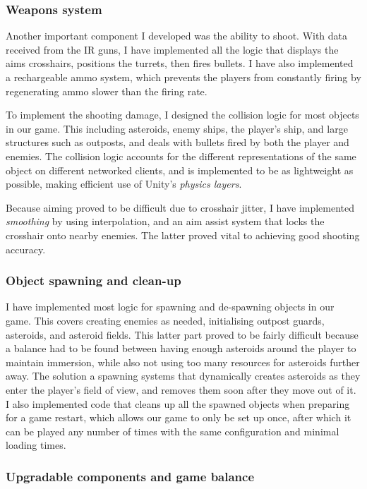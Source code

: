 \documentclass[a4paper,11pt]{article}
\begin{document}
\subsubsection{Weapons system}

Another important component I developed was the ability to shoot. With data received from the IR guns, I have implemented all the logic that displays the aims crosshairs, positions the turrets, then fires bullets. I have also implemented a rechargeable ammo system, which prevents the players from constantly firing by regenerating ammo slower than the firing rate.

To implement the shooting damage, I designed the collision logic for most objects in our game. This including asteroids, enemy ships, the player’s ship, and large structures such as outposts, and deals with bullets fired by both the player and enemies. The collision logic accounts for the different representations of the same object on different networked clients, and is implemented to be as lightweight as possible, making efficient use of Unity's \emph{physics layers}.

Because aiming proved to be difficult due to crosshair jitter, I have implemented \emph{smoothing} by using interpolation, and an aim assist system that locks the crosshair onto nearby enemies. The latter proved vital to achieving good shooting accuracy.

\subsubsection{Object spawning and clean-up}

I have implemented most logic for spawning and de-spawning objects in our game. This covers creating enemies as needed, initialising outpost guards, asteroids, and asteroid fields. This latter part proved to be fairly difficult because a balance had to be found between having enough asteroids around the player to maintain immersion, while also not using too many resources for asteroids further away. The solution a spawning systems that dynamically creates asteroids as they enter the player's field of view, and removes them soon after they move out of it. I also implemented code that cleans up all the spawned objects when preparing for a game restart, which allows our game to only be set up once, after which it can be played any number of times with the same configuration and minimal loading times.

\subsubsection{Upgradable components and game balance}
\end{document}
